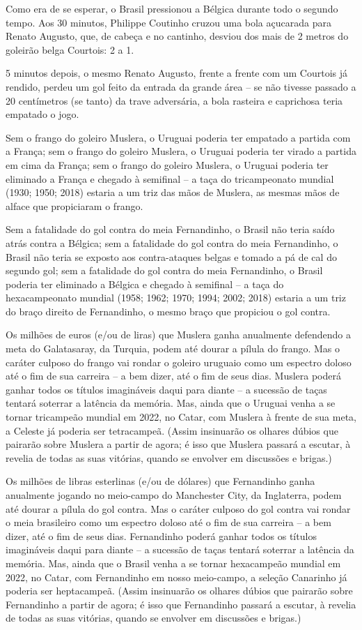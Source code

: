 Como era de se esperar, o Brasil pressionou a Bélgica durante todo o
segundo tempo. Aos 30 minutos, Philippe Coutinho cruzou uma bola
açucarada para Renato Augusto, que, de cabeça e no cantinho, desviou dos
mais de 2 metros do goleirão belga Courtois: 2 a 1.

5 minutos depois, o mesmo Renato Augusto, frente a frente com um
Courtois já rendido, perdeu um gol feito da entrada da grande área -- se
não tivesse passado a 20 centímetros (se tanto) da trave adversária, a
bola rasteira e caprichosa teria empatado o jogo.

Sem o frango do goleiro Muslera, o Uruguai poderia ter empatado a
partida com a França; sem o frango do goleiro Muslera, o Uruguai poderia
ter virado a partida em cima da França; sem o frango do goleiro Muslera,
o Uruguai poderia ter eliminado a França e chegado à semifinal -- a taça
do tricampeonato mundial (1930; 1950; 2018) estaria a um triz das mãos
de Muslera, as mesmas mãos de alface que propiciaram o frango.

Sem a fatalidade do gol contra do meia Fernandinho, o Brasil não teria
saído atrás contra a Bélgica; sem a fatalidade do gol contra do meia
Fernandinho, o Brasil não teria se exposto aos contra-ataques belgas e
tomado a pá de cal do segundo gol; sem a fatalidade do gol contra do
meia Fernandinho, o Brasil poderia ter eliminado a Bélgica e chegado à
semifinal -- a taça do hexacampeonato mundial (1958; 1962; 1970; 1994;
2002; 2018) estaria a um triz do braço direito de Fernandinho, o mesmo
braço que propiciou o gol contra.

Os milhões de euros (e/ou de liras) que Muslera ganha anualmente
defendendo a meta do Galatasaray, da Turquia, podem até dourar a pílula
do frango. Mas o caráter culposo do frango vai rondar o goleiro uruguaio
como um espectro doloso até o fim de sua carreira -- a bem dizer, até o
fim de seus dias. Muslera poderá ganhar todos os títulos imagináveis
daqui para diante -- a sucessão de taças tentará soterrar a latência da
memória. Mas, ainda que o Uruguai venha a se tornar tricampeão mundial
em 2022, no Catar, com Muslera à frente de sua meta, a Celeste já
poderia ser tetracampeã. (Assim insinuarão os olhares dúbios que
pairarão sobre Muslera a partir de agora; é isso que Muslera passará a
escutar, à revelia de todas as suas vitórias, quando se envolver em
discussões e brigas.)

Os milhões de libras esterlinas (e/ou de dólares) que Fernandinho ganha
anualmente jogando no meio-campo do Manchester City, da Inglaterra,
podem até dourar a pílula do gol contra. Mas o caráter culposo do gol
contra vai rondar o meia brasileiro como um espectro doloso até o fim de
sua carreira -- a bem dizer, até o fim de seus dias. Fernandinho poderá
ganhar todos os títulos imagináveis daqui para diante -- a sucessão de
taças tentará soterrar a latência da memória. Mas, ainda que o Brasil
venha a se tornar hexacampeão mundial em 2022, no Catar, com Fernandinho
em nosso meio-campo, a seleção Canarinho já poderia ser heptacampeã.
(Assim insinuarão os olhares dúbios que pairarão sobre Fernandinho a
partir de agora; é isso que Fernandinho passará a escutar, à revelia de
todas as suas vitórias, quando se envolver em discussões e brigas.)

